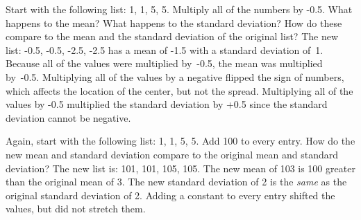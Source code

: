 \D{\newpage}

\begin{examplewrap}
\begin{nexample}{Start with the following list:  {1, 1, 5, 5}. Multiply all of the numbers by \mbox{-0.5}. What happens to the mean? What happens to the standard deviation? How do these compare to the mean and the standard deviation of the original list?}
The new list: {-0.5, -0.5, -2.5, -2.5} has a mean of -1.5 with a standard deviation of~1. Because all of the values were multiplied by~\mbox{-0.5}, the mean was multiplied by~\mbox{-0.5}. Multiplying all of the values by a negative flipped the sign of numbers, which affects the location of the center, but not the spread. Multiplying all of the values by \mbox{-0.5} multiplied the standard deviation by +0.5 since the standard deviation cannot be negative.
\end{nexample}
\end{examplewrap}

\begin{examplewrap}
\begin{nexample}{Again, start with the following list: {1, 1, 5, 5}. Add 100 to every entry. How do the new mean and standard deviation compare to the original mean and standard deviation?}
The new list is: {101, 101, 105, 105}. The new mean of 103 is 100 greater than the original mean of 3. The new standard deviation of 2 is the \emph{same} as the original standard deviation of 2. Adding a constant to every entry shifted the values, but did not stretch them.
\end{nexample}
\end{examplewrap}


